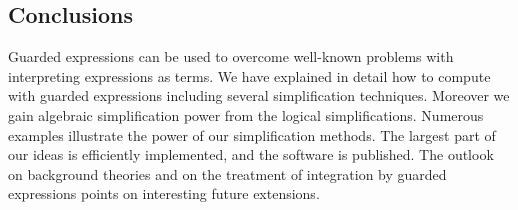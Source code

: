 \subsection{Conclusions}
Guarded expressions can be used to overcome well-known problems with
interpreting expressions as terms. We have explained in detail how to
compute with guarded expressions including several simplification
techniques. Moreover we gain algebraic simplification power from the
logical simplifications. Numerous examples illustrate the power of our
simplification methods. The largest part of our ideas is efficiently
implemented, and the software is published. The outlook on background
theories and on the treatment of integration by guarded expressions
points on interesting future extensions.
\nocite{Bradford:92}

